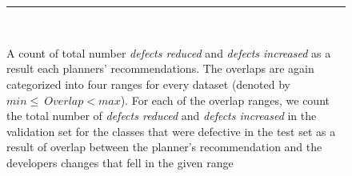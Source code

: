 \begin{figure}[!htbp]
\\~\hrule~
\caption{A count of total number \textit{defects reduced} and \textit{defects increased} as a result each planners' recommendations. The overlaps are again categorized into four ranges for every dataset (denoted by $min\leq~Overlap<max$). For each of the overlap ranges, we count the total number of \textit{defects reduced} and \textit{defects increased} in the validation set for the classes that were defective in the test set as a result of overlap between the planner's recommendation and the developers changes that fell in the given range}
\label{fig:rq2}
\end{figure}